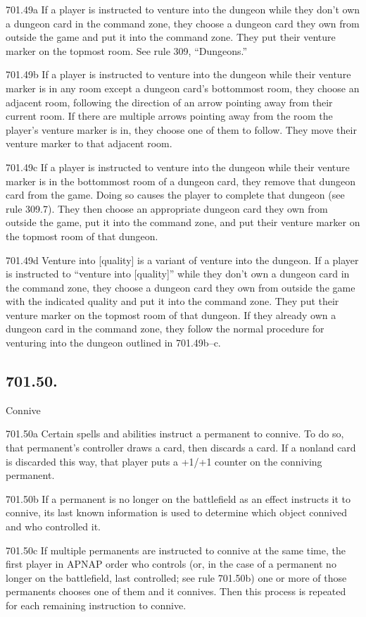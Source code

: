 701.49a If a player is instructed to venture into the dungeon while they don’t own a dungeon card in the command zone, they choose a dungeon card they own from outside the game and put it into the command zone. They put their venture marker on the topmost room. See rule 309, “Dungeons.”

701.49b If a player is instructed to venture into the dungeon while their venture marker is in any room except a dungeon card’s bottommost room, they choose an adjacent room, following the direction of an arrow pointing away from their current room. If there are multiple arrows pointing away from the room the player’s venture marker is in, they choose one of them to follow. They move their venture marker to that adjacent room.

701.49c If a player is instructed to venture into the dungeon while their venture marker is in the bottommost room of a dungeon card, they remove that dungeon card from the game. Doing so causes the player to complete that dungeon (see rule 309.7). They then choose an appropriate dungeon card they own from outside the game, put it into the command zone, and put their venture marker on the topmost room of that dungeon.

701.49d Venture into [quality] is a variant of venture into the dungeon. If a player is instructed to “venture into [quality]” while they don’t own a dungeon card in the command zone, they choose a dungeon card they own from outside the game with the indicated quality and put it into the command zone. They put their venture marker on the topmost room of that dungeon. If they already own a dungeon card in the command zone, they follow the normal procedure for venturing into the dungeon outlined in 701.49b–c.

\subsection*{701.50.}
Connive

701.50a Certain spells and abilities instruct a permanent to connive. To do so, that permanent’s controller draws a card, then discards a card. If a nonland card is discarded this way, that player puts a +1/+1 counter on the conniving permanent.

701.50b If a permanent is no longer on the battlefield as an effect instructs it to connive, its last known information is used to determine which object connived and who controlled it.

701.50c If multiple permanents are instructed to connive at the same time, the first player in APNAP order who controls (or, in the case of a permanent no longer on the battlefield, last controlled; see rule 701.50b) one or more of those permanents chooses one of them and it connives. Then this process is repeated for each remaining instruction to connive.

